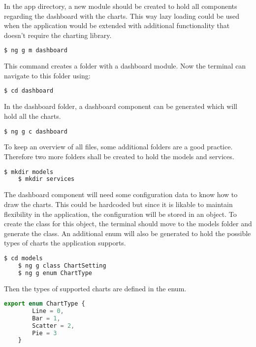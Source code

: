 In the app directory, a new module should be created to hold all components regarding the dashboard with the charts. This way lazy loading could be used when the application would be extended with additional functionality that doesn't require the charting library.

\begin{lstlisting}[language=bash]
	$ ng g m dashboard
\end{lstlisting}

This command creates a folder with a dashboard module. Now the terminal can navigate to this folder using:

\begin{lstlisting}[language=bash]
	$ cd dashboard
\end{lstlisting}

In the dashboard folder, a dashboard component can be generated which will hold all the charts.

\begin{lstlisting}[language=bash]
	$ ng g c dashboard
\end{lstlisting}

To keep an overview of all files, some additional folders are a good practice. Therefore two more folders shall be created to hold the models and services.

\begin{lstlisting}[language=bash]
	$ mkdir models
	$ mkdir services
\end{lstlisting}

The dashboard component will need some configuration data to know how to draw the charts. This could be hardcoded but since it is likable to maintain flexibility in the application, the configuration will be stored in an object. To create the class for this object, the terminal should move to the models folder and generate the class. An additional enum will also be generated to hold the possible types of charts the application supports.

\begin{lstlisting}[language=bash]
	$ cd models
	$ ng g class ChartSetting
	$ ng g enum ChartType
\end{lstlisting}

Then the types of supported charts are defined in the enum.

\begin{lstlisting}[language=JavaScript]
	export enum ChartType {
		Line = 0,
		Bar = 1,
		Scatter = 2,
		Pie = 3
	}
\end{lstlisting}

